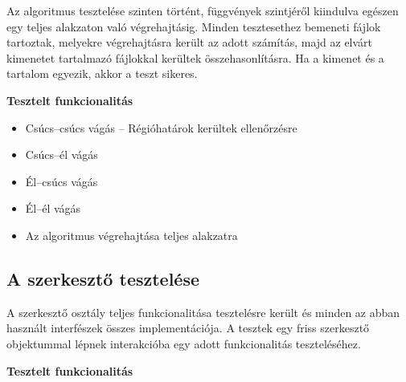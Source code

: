 Az algoritmus tesztelése szinten történt, függvények szintjéről kiindulva egészen egy teljes alakzaton való végrehajtásig. Minden tesztesethez bemeneti fájlok tartoztak, melyekre végrehajtásra került az adott számítás, majd az elvárt kimenetet tartalmazó fájlokkal kerültek összehasonlításra. Ha a kimenet és a tartalom egyezik, akkor a teszt sikeres.

\textbf{Tesztelt funkcionalitás}

\begin{itemize}
	\item Csúcs--csúcs vágás -- Régióhatárok kerültek ellenőrzésre
	\item Csúcs--él vágás
	\item Él--csúcs vágás
	\item Él--él vágás
	\item Az algoritmus végrehajtása teljes alakzatra
\end{itemize}


\subsection{A szerkesztő tesztelése}

A szerkesztő osztály teljes funkcionalitása tesztelésre került és minden az abban használt interfészek összes implementációja. A tesztek egy friss szerkesztő objektummal lépnek interakcióba egy adott funkcionalitás teszteléséhez.

\textbf{Tesztelt funkcionalitás}

